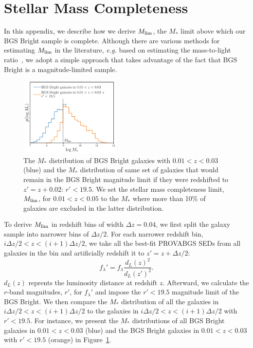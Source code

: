 \section{Stellar Mass Completeness} \label{sec:mscomp}
In this appendix, we describe how we derive $M_{\rm lim}$, the $M_*$ limit
above which our BGS Bright sample is complete. 
Although there are various methods for estimating $M_{\rm lim}$ in the
literature, \emph{e.g.} based on estimating the mass-to-light
ratio~\citep{pozzetti2010, moustakas2013}, we adopt a simple approach that
takes advantage of the fact that BGS Bright is a magnitude-limited sample. 

\begin{figure}
\begin{center}
    \includegraphics[width=0.45\textwidth]{figs/psmf_logMstar_comp_demo.pdf}
    \caption{
        The $M_*$ distribution of BGS Bright galaxies with $0.01 < z < 0.03$
        (blue) and the $M_*$ distribution of same set of galaxies that would
        remain in the BGS Bright magnitude limit if they were redshifted to 
        $z' = z + 0.02$: $r' < 19.5$. 
        We set the stellar mass completeness limit, $M_{\rm lim}$, for $0.01 <
        z < 0.05$ to the $M_*$ where more than 10\% of galaxies are excluded in
        the latter distribution. 
    }\label{fig:ms_comp0}
\end{center}
\end{figure}

To derive $M_{\rm lim}$ in redshift bins of width $\Delta z=0.04$, we first
split the galaxy sample into narrower bins of $\Delta z/2$. 
For each narrower redshift bin, $i \Delta z/2 < z < (i+1) \Delta z/2$, we take
all the best-fit {\sc PROVABGS} SEDs from all  galaxies in the bin and
artificially redshift it to $z' = z + \Delta z/2$:
\begin{equation}
    f_\lambda' = f_\lambda \frac{d_L(z)^2}{d_L(z')^2}.
\end{equation} 
$d_L(z)$ reprents the luminosity distance at redshift $z$. 
Afterward, we calculate the $r$-band magnitudes, $r'$, for $f_\lambda'$ and
impose the $r' < 19.5$ magnitude limit of the BGS Bright. 
We then compare the $M_*$ distribution of all the galaxies in 
$i \Delta z/2 < z < (i+1) \Delta z/2$ to the galaxies in 
$i \Delta z/2 < z < (i+1) \Delta z/2$ with $r' < 19.5$.
For instance,  we present the $M_*$ distributions of all BGS
Bright galaxies in $0.01 < z < 0.03$ (blue) and the BGS Bright galaxies in
$0.01 < z < 0.03$ with $r' < 19.5$ (orange) in Figure~\ref{fig:ms_comp0}.

